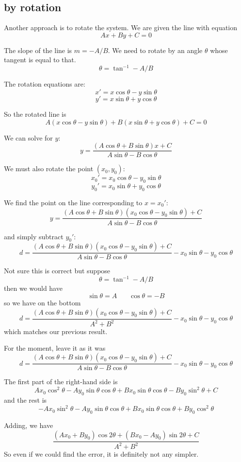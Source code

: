 \documentclass[11pt, oneside]{article}
\begin{document}
\subsection*{by rotation}

Another approach is to rotate the system.  We are given the line with equation
\[ Ax + By + C = 0 \]

The slope of the line is $m=-A/B$.  We need to rotate by an angle $\theta$ whose tangent is equal to that.
\[ \theta = \tan^{-1} -A/B \]

The rotation equations are:
\[ x' = x \cos \theta - y \sin \theta \]
\[ y' = x \sin \theta + y \cos \theta \]

So the rotated line is 
\[ A(x \cos \theta - y \sin \theta) + B(x \sin \theta + y \cos \theta) + C = 0 \]

We can solve for $y$:
\[ y = \frac{(A \cos \theta + B \sin \theta)x + C}{A \sin \theta - B \cos \theta} \]

We must also rotate the point $(x_0,y_0)$:
\[ x_0' = x_0 \cos \theta - y_0 \sin \theta \]
\[ y_0' = x_0 \sin \theta + y_0 \cos \theta \]

We find the point on the line corresponding to $x = x_0'$:
\[ y = \frac{(A \cos \theta + B \sin \theta)(x_0 \cos \theta - y_0 \sin \theta) + C}{A \sin \theta - B \cos \theta} \]

and simply subtract $y_0'$:
\[ d = \frac{(A \cos \theta + B \sin \theta)(x_0 \cos \theta - y_0 \sin \theta) + C}{A \sin \theta - B \cos \theta} - x_0 \sin \theta - y_0 \cos \theta\]

Not sure this is correct but suppose
\[ \theta = \tan^{-1} -A/B \]
then we would have
\[ \sin \theta = A \ \ \ \ \ \ \ \ \cos \theta = - B \]
so we have on the bottom
\[ d = \frac{(A \cos \theta + B \sin \theta)(x_0 \cos \theta - y_0 \sin \theta) + C}{A^2 + B^2} - x_0 \sin \theta - y_0 \cos \theta\]
which matches our previous result.

For the moment, leave it as it was
\[ d = \frac{(A \cos \theta + B \sin \theta)(x_0 \cos \theta - y_0 \sin \theta) + C}{A \sin \theta - B \cos \theta} - x_0 \sin \theta - y_0 \cos \theta\]

The first part of the right-hand side is
\[ A x_0 \cos^2 \theta - A y_0 \sin \theta \cos \theta + Bx_0 \sin \theta  \cos \theta - B y_0 \sin^2 \theta + C \]
and the rest is
\[ - Ax_0 \sin^2 \theta - A y_0 \sin \theta \cos \theta + B x_0 \sin \theta \cos \theta + B y_0 \cos^2 \theta \]

Adding, we have
\[ \frac{(Ax_0 + By_0) \cos 2 \theta + (B x_0 - A y_0)\sin 2 \theta + C}{A^2 + B^2} \]
So even if we could find the error, it is definitely not any simpler.
\end{document}
